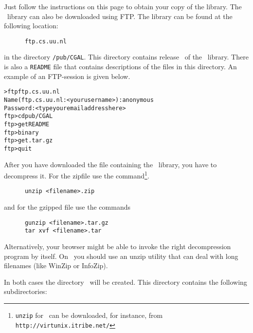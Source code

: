 Just follow the instructions on this page to obtain your copy of the
library. The \cgal\ library can also be downloaded using FTP. The
library can be found at the following location:

\begin{verbatim}
      ftp.cs.uu.nl
\end{verbatim}

in the directory \texttt{/pub/CGAL}. This directory contains release
\cgalrelease\ of the \cgal\ library. There is also a \texttt{README}
file that contains descriptions of the files in this directory. An
example of an FTP-session is given below.

\begin{alltt}
      > ftp ftp.cs.uu.nl 
      Name (ftp.cs.uu.nl:<your username>): anonymous
      Password: <type your email address here>
      ftp> cd pub/CGAL
      ftp> get README
      ftp> binary
      ftp> get \cgaldir.tar.gz
      ftp> quit
\end{alltt}

After you have downloaded the file containing the \cgal\ library, you
have to decompress it. For the zipfile use the
command\footnote{\texttt{unzip} for \mswin\ 
can be downloaded, for instance, from
\texttt{http://virtunix.itribe.net/}}.

\begin{verbatim}
      unzip <filename>.zip
\end{verbatim}

and for the gzipped file use the commands

\begin{verbatim}
      gunzip <filename>.tar.gz
      tar xvf <filename>.tar
\end{verbatim}

Alternatively, your browser might be able to invoke the right
decompression program by itself.
On \mswin\ you should use an unzip utility that can deal with long
filenames (like WinZip or InfoZip).

In both cases the directory \cgaldir\ will be created. This directory
contains the following subdirectories:\index{directories!structure}

